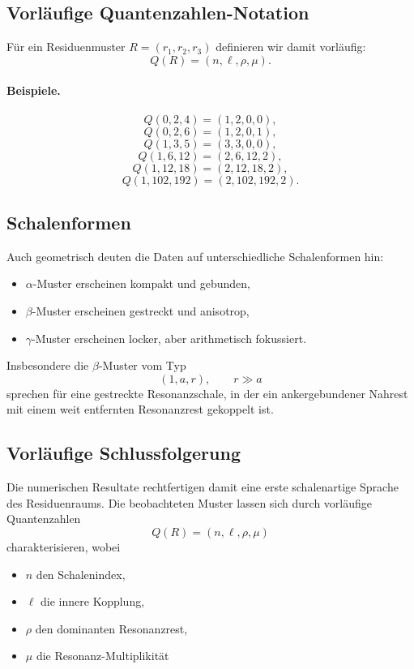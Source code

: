\documentclass[11pt,a4paper]{article}
\theoremstyle{definition}
\theoremstyle{plain}
\theoremstyle{remark}
\begin{document}
	\subsection{Vorläufige Quantenzahlen-Notation}
	
	Für ein Residuenmuster \(R=(r_1,r_2,r_3)\) definieren wir damit vorläufig:
	\[
	Q(R)=(n,\ell,\rho,\mu).
	\]
	
	\paragraph{Beispiele.}
	\[
	Q(0,2,4)=(1,2,0,0),
	\]
	\[
	Q(0,2,6)=(1,2,0,1),
	\]
	\[
	Q(1,3,5)=(3,3,0,0),
	\]
	\[
	Q(1,6,12)=(2,6,12,2),
	\]
	\[
	Q(1,12,18)=(2,12,18,2),
	\]
	\[
	Q(1,102,192)=(2,102,192,2).
	\]
	
	\subsection{Schalenformen}
	
	Auch geometrisch deuten die Daten auf unterschiedliche Schalenformen hin:
	
	\begin{itemize}
		\item \(\alpha\)-Muster erscheinen kompakt und gebunden,
		\item \(\beta\)-Muster erscheinen gestreckt und anisotrop,
		\item \(\gamma\)-Muster erscheinen locker, aber arithmetisch fokussiert.
	\end{itemize}
	
	Insbesondere die \(\beta\)-Muster vom Typ
	\[
	(1,a,r),\qquad r\gg a
	\]
	sprechen für eine gestreckte Resonanzschale, in der ein ankergebundener Nahrest mit einem weit entfernten Resonanzrest gekoppelt ist.
	
	\subsection{Vorläufige Schlussfolgerung}
	
	Die numerischen Resultate rechtfertigen damit eine erste schalenartige Sprache des Residuenraums. 
	Die beobachteten Muster lassen sich durch vorläufige Quantenzahlen
	\[
	Q(R)=(n,\ell,\rho,\mu)
	\]
	charakterisieren, wobei
	
	\begin{itemize}
		\item \(n\) den Schalenindex,
		\item \(\ell\) die innere Kopplung,
		\item \(\rho\) den dominanten Resonanzrest,
		\item \(\mu\) die Resonanz-Multiplikität
	\end{itemize}
	
\end{document}
